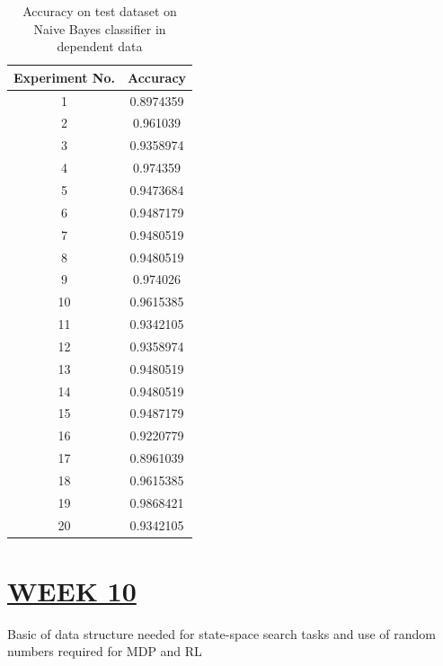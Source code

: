 \documentclass[15pt,journal]{IEEEtran}
\begin{document}
\begin{table}[!ht] %
\centering
\begin{tabular}{| c | c |}
\hline
Experiment No. &  Accuracy \\
\hline 
1 & 0.8974359  \\
\hline
2 & 0.961039 \\
\hline
3 & 0.9358974 \\
\hline
4 & 0.974359  \\
\hline
5 & 0.9473684  \\
\hline
6 & 0.9487179 \\
\hline
7 & 0.9480519 \\
\hline
8 & 0.9480519 \\
\hline
9 & 0.974026 \\
\hline
10 & 0.9615385 \\
\hline
11 & 0.9342105 \\
\hline
12 & 0.9358974 \\
\hline
13 & 0.9480519 \\
\hline
14 & 0.9480519 \\
\hline
15 & 0.9487179 \\
\hline
16 & 0.9220779 \\
\hline
17 & 0.8961039 \\
\hline
18 & 0.9615385 \\
\hline
19 & 0.9868421 \\
\hline
20 & 0.9342105 \\
\hline
\end{tabular}

\label{table:Exps}
\caption{Accuracy on test dataset on Naive Bayes classifier in dependent data}
\end{table}


\section{\large{\underline{WEEK 10}}}
Basic of data structure needed for state-space search tasks and use of random numbers required for MDP and RL
\end{document}
